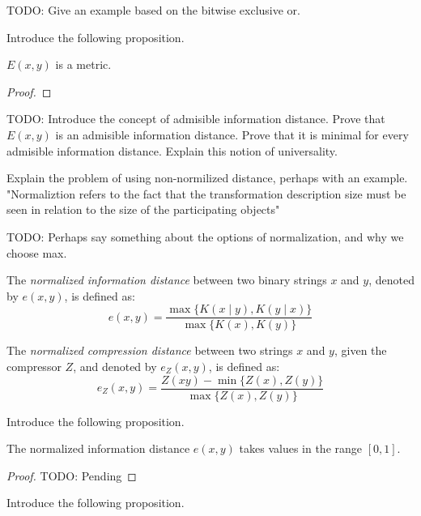 \begin{example}
{\color{red} TODO: Give an example based on the bitwise exclusive or.}
\end{example}

{\color{red} Introduce the following proposition.}

\begin{proposition}
{\color{red} $E(x, y)$ is a metric.}
\end{proposition}
\begin{proof}
\end{proof}

{\color{red} TODO: Introduce the concept of admisible information distance. Prove that $E(x, y)$ is an admisible information distance. Prove that it is minimal for every admisible information distance. Explain this notion of universality.}

{\color{red} Explain the problem of using non-normilized distance, perhaps with an example. "Normaliztion refers to the fact that the transformation description size must be seen in relation to the size of the participating objects"}

{\color{red} TODO: Perhaps say something about the options of normalization, and why we choose max.}

\begin{definition}
The \emph{normalized information distance} between two binary strings $x$ and $y$, denoted by $e(x, y)$, is defined as:
\[
e(x, y) = \frac{\max\{ K(x \mid y), K(y \mid x) \}}{\max \{ K(x), K(y) \} }
\]
\end{definition}

\begin{definition}
The \emph{normalized compression distance} between two strings $x$ and $y$, given the compressor $Z$, and denoted by $e_Z(x, y)$, is defined as:
\[
e_Z(x, y) = \frac{ Z(xy) - \min\{ Z(x), Z(y) \}}{\max \{ Z(x), Z(y) \} }
\]
\end{definition}

{\color{red} Introduce the following proposition.}

\begin{proposition}
\label{prop:ncd_between_zero_and_one}
The normalized information distance $e(x, y)$ takes values in the range $[0, 1]$.
\end{proposition}
\begin{proof}
{\color{red} TODO: Pending}
\end{proof}

{\color{red} Introduce the following proposition.}

